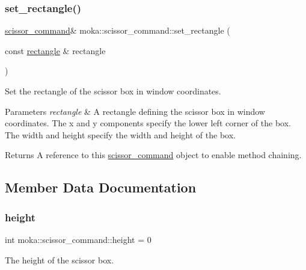 \subsubsection{\texorpdfstring{set\_rectangle()}{set\_rectangle()}\hspace{0.1cm}{\footnotesize\ttfamily [2/2]}}
{\footnotesize\ttfamily \mbox{\hyperlink{classmoka_1_1scissor__command}{scissor\+\_\+command}}\& moka\+::scissor\+\_\+command\+::set\+\_\+rectangle (\begin{DoxyParamCaption}\item[{const \mbox{\hyperlink{namespacemoka_ab5e90635f0a0441cc99f2328bc34500d}{rectangle}} \&}]{rectangle }\end{DoxyParamCaption})}



Set the rectangle of the scissor box in window coordinates. 


\begin{DoxyParams}{Parameters}
{\em rectangle} & A rectangle defining the scissor box in window coordinates. The x and y components specify the lower left corner of the box. The width and height specify the width and height of the box. \\
\hline
\end{DoxyParams}
\begin{DoxyReturn}{Returns}
A reference to this \mbox{\hyperlink{classmoka_1_1scissor__command}{scissor\+\_\+command}} object to enable method chaining. 
\end{DoxyReturn}


\subsection{Member Data Documentation}
\mbox{\label{classmoka_1_1scissor__command_aa1ab1cbe7525e54cfd66ac8478854549}} 
\subsubsection{\texorpdfstring{height}{height}}
{\footnotesize\ttfamily int moka\+::scissor\+\_\+command\+::height = 0}

The height of the scissor box. \mbox{\label{classmoka_1_1scissor__command_aac88f787b8e446f923722dda70837a39}} 
